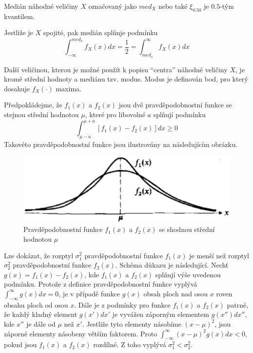 \begin{definition}[Medián]
Medián náhodné veličiny $X$ označovaný jako $med_X$ nebo také $\xi_{0.50}$ je $0.5$-tým kvantilem.
\end{definition}

Jestliže je $X$ spojité, pak medián splňuje podmínku
\begin{equation*}
\int_{-\infty}^{med_x}f_X(x)dx = \frac{1}{2} = \int_{med_x}^{\infty}f_X(x)dx
\end{equation*}

\begin{definition}[Modus]
Další veličinou, kterou je možné použít k popisu ``centra'' náhodné veličiny $X$, je kromě střední hodnoty a mediánu tzv. modus. Modus je definován bod, pro který dosahuje $f_X(\cdot)$ maxima.
\end{definition}

Předpokládejme, že $f_1(x)$ a $f_2(x)$ jsou dvě pravděpodobnostní funkce se stejnou střední hodnotou $\mu$, které pro libovolné $a$ splňují podmínku
\begin{equation*}
\int_{\mu - a}^{\mu + a} [f_1(x) - f_2(x)]dx \ge 0
\end{equation*}
Takovéto pravděpodobnostní funkce jsou ilustrovány na následujícím obrázku.
\begin{figure}[htp]
\centering
\includegraphics[scale = 0.5]{pictures/two_distributions.eps}
\caption{Pravděpodobnostní funkce $f_1(x)$ a $f_2(x)$ se shodnou střední hodnotou $\mu$}
\label{two_distributions}
\end{figure}
Lze dokázat, že rozptyl $\sigma_1^2$ pravděpodobnostní funkce $f_1(x)$ je menší než rozptyl $\sigma_2^2$ pravděpodobnostní funkce $f_2(x)$. Schéma důkazu je následující. Nechť $g(x) = f_1(x) - f_2(x)$, kde $f_1(x)$ a $f_2(x)$ splňují výše uvedenou podmínku. Protože z definice pravděpodobnostní funkce vyplývá $\int_{-\infty}^{\infty} g(x) dx = 0$, je v případě funkce $g(x)$ obsah ploch nad osou $x$ roven obsahu ploch od osou $x$. Dále je z podmínky pro funkce $f_1(x)$ a $f_2(x)$ patrné, že každý kladný element $g(x')dx'$ je vyvážen záporným elementem $g(x'')dx''$, kde $x''$ je dále od $\mu$ než $x'$. Jestliže tyto elementy násobíme $(x - \mu)^2$, jsou záporné elementy násobeny větším faktorem. Proto $\int_{-\infty}^{\infty}(x - \mu)^2 g(x) dx < 0$, pokud jsou $f_1(x)$ a $f_2(x)$ rozdílné. Z toho vyplývá $\sigma_1^2 < \sigma_2^2$.

